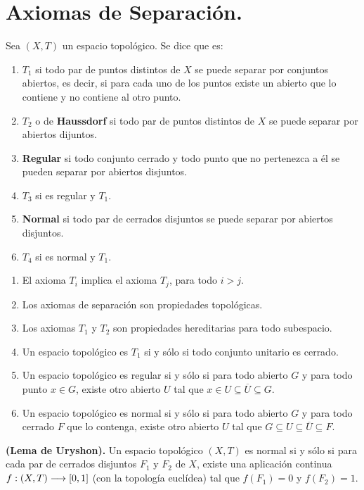 \documentclass[cursovd_portada.tex]{subfiles}
\begin{document}
\section{Axiomas de Separación.}
\begin{defi}
Sea $(X,T)$ un espacio topológico. Se dice que es:
\begin{enumerate}
\item $T_1$ si todo par de puntos distintos de $X$ se puede separar por conjuntos abiertos, es decir, si para cada
uno de los puntos existe un abierto que lo contiene y no contiene al otro punto.
\item $T_2$ o de {\bf Haussdorf} si todo par de puntos distintos de $X$ se puede separar por abiertos dijuntos.
\item {\bf Regular} si todo conjunto cerrado y todo punto que no pertenezca a él se pueden separar por abiertos
disjuntos.
\item $T_3$ si es regular y $T_1$.
\item {\bf Normal} si todo par de cerrados disjuntos se puede separar por abiertos disjuntos.
\item $T_4$ si es normal y $T_1$.
\end{enumerate}
\end{defi}
\begin{prop}
\begin{enumerate}
\item El axioma $T_i$ implica el axioma $T_j$, para todo $i>j$.
\item Los axiomas de separación son propiedades topológicas.
\item Los axiomas $T_1$ y $T_2$ son propiedades hereditarias para todo subespacio.
\item Un espacio topológico es $T_1$ si y sólo si todo conjunto unitario es cerrado.
\item Un espacio topológico es regular si y sólo si para todo abierto $G$ y para todo punto $x\in G$,
existe otro abierto $U$ tal que $x\in U\subseteq\overline{U}\subseteq G$.
\item Un espacio topológico es normal si y sólo si para todo abierto $G$ y para todo cerrado $F$ que lo contenga,
existe otro abierto $U$ tal que $G\subseteq U\subseteq\overline{U}\subseteq F$.
\end{enumerate}
\end{prop}
\begin{teorema}
{\bf (Lema de Uryshon).} Un espacio topológico $(X,T)$ es normal si y sólo si para cada par de cerrados disjuntos
$F_1$ y $F_2$ de $X$, existe una aplicación continua $f:(X,T)\longrightarrow [0,1]$ (con la topología euclídea) tal que
$f(F_1)=0$ y $f(F_2)=1$.
\end{teorema}
\end{document}

